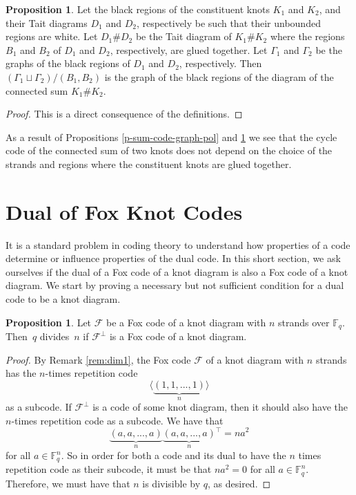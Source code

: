 \documentclass[11pt,a4paper]{article}
\theoremstyle{definition}
\newtheorem{proposition}[theorem]{Proposition}
\newcommand{\numberset}{\mathbb}
\newcommand{\F}{\numberset{F}}
\newcommand{\mF}{\mathcal{F}}
\begin{document}
\begin{proposition}\label{p-prod-sum-knots}
Let the black regions of the constituent knots $K_1$ and $K_2$, and their Tait diagrams $D_1$ and $D_2$, respectively 
be such that their unbounded regions are white. 
Let $D_1\# D_2$ be the Tait diagram of $K_1\# K_2$ where the regions $B_1$ and $B_2$ of $D_1$ and $D_2$, respectively, are glued together.
Let $\Gamma_1$ and $\Gamma_2$ be the graphs of the black regions of $D_1$ and $D_2$, respectively.
Then $ (\Gamma_1 \sqcup \Gamma_2 )/ (B_1,B_2)$ is the graph of the black regions of the diagram of the connected sum $K_1\# K_2$.
\end{proposition}
\begin{proof}
This is a direct consequence of the definitions.  
\end{proof}

As a result of Propositions \ref{p-sum-code-graph-pol} and \ref{p-prod-sum-knots} we see that the cycle code of the connected sum of two knots 
does not depend on the choice of the strands and regions where the constituent knots are glued together.


\section{Dual of Fox Knot Codes}
\label{sec:dual}
\label{sec:6}


It is a standard problem in coding theory to understand how properties of a code determine or influence properties of the dual code.
In this short section, we ask ourselves 
if the dual of a Fox code of a knot diagram is also a Fox code of a knot diagram. 
We start by proving a necessary but not sufficient condition for a dual code to be a knot diagram.
\begin{proposition}
\label{prop:pdividesn}
Let $\mF$ be a Fox code of a knot diagram with $n$ strands over $\F_q.$ Then~$q$ divides~$n$ if $\mF^\perp$ is a Fox code of a knot diagram. 
\end{proposition}
\begin{proof}
By Remark \ref{rem:dim1}, the Fox code $\mF$ of a knot diagram with $n$ strands has the $n$-times repetition code $$\langle \underbrace{(1,1,...,1)}_n \rangle$$ as a subcode. If  $\mF^\perp$ is a code of some knot diagram, then it should also have the $n$-times repetition code as a subcode. 
We have that $$\underbrace{(a,a,...,a)}_{n}\underbrace{(a,a,...,a)}_{n} {^\top} = na^2$$ for all $a \in \F_q^n$. So in order for both a code and its dual to have the $n$ times repetition code as their subcode, it must be 
that $na^2 = 0$ for all $a \in \F_q^n$. Therefore, we must have that $n$ is divisible by $q$, as desired.
\end{proof}
\end{document}
